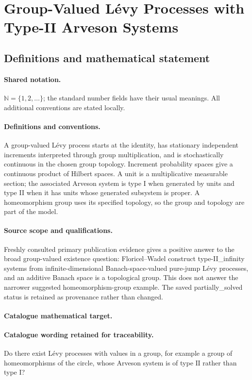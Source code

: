 \documentclass[11pt]{article}
\begin{document}
\section{Group-Valued Lévy Processes with Type-II Arveson Systems}\label{statement}

\subsection{Definitions and mathematical statement}

\paragraph{Shared notation.}$\mathbb N=\{1,2,\ldots\}$; the standard number fields have their usual meanings. All additional conventions are stated locally.


\paragraph{Definitions and conventions.} A group-valued Lévy process starts at the identity, has stationary independent increments interpreted through group multiplication, and is stochastically continuous in the chosen group topology. Increment probability spaces give a continuous product of Hilbert spaces. A unit is a multiplicative measurable section; the associated Arveson system is type I when generated by units and type II when it has units whose generated subsystem is proper. A homeomorphism group uses its specified topology, so the group and topology are part of the model.

\paragraph{Source scope and qualifications.} Freshly consulted primary publication evidence gives a positive answer to the broad group-valued existence question: Floricel--Wadel construct type-II\_infinity systems from infinite-dimensional Banach-space-valued pure-jump Lévy processes, and an additive Banach space is a topological group. This does not answer the narrower suggested homeomorphism-group example. The saved partially\_solved status is retained as provenance rather than changed.

\paragraph{Catalogue mathematical target.}
\paragraph{Catalogue wording retained for traceability.}
Do there exist Lévy processes with values in a group, for example a group of homeomorphisms of the circle, whose Arveson system is of type $\mathrm{II}$ rather than type $\mathrm I$?
\end{document}
